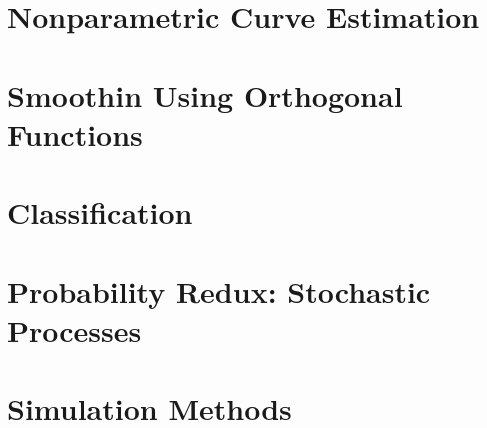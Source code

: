 \documentclass{article}
\begin{document}
\section{Nonparametric Curve Estimation}

\section{Smoothin Using Orthogonal Functions}

\section{Classification}

\section{Probability Redux: Stochastic Processes}

\section{Simulation Methods}
\end{document}
